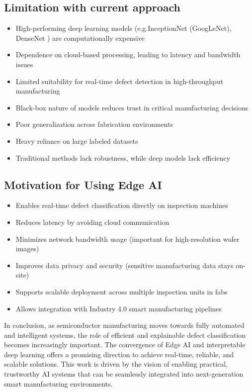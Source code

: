 \subsection {Limitation with current approach }
\begin{itemize}
\item High-performing deep learning models (e.g.InceptionNet (GoogLeNet), DenseNet ) are computationally expensive
\item Dependence on cloud-based processing, leading to latency and bandwidth issues
\item Limited suitability for real-time defect detection in high-throughput manufacturing
\item Black-box nature of models reduces trust in critical manufacturing decisions
\item Poor generalization across fabrication environments
\item Heavy reliance on large labeled datasets
\item Traditional methods lack robustness, while deep models lack efficiency
\end{itemize} 

\subsection {Motivation for Using Edge AI}
\begin{itemize}
\item Enables real-time defect classification directly on inspection machines
\item Reduces latency by avoiding cloud communication
\item Minimizes network bandwidth usage (important for high-resolution wafer images)
\item Improves data privacy and security (sensitive manufacturing data stays on-site)
\item Supports scalable deployment across multiple inspection units in fabs
\item Allows integration with Industry 4.0 smart manufacturing pipelines
\end{itemize}

In conclusion, as semiconductor manufacturing moves towards fully automated and intelligent systems, the role of efficient and explainable defect classification becomes increasingly important. The convergence of Edge AI and interpretable deep learning offers a promising direction to achieve real-time, reliable, and scalable solutions. This work is driven by the vision of enabling practical, trustworthy AI systems that can be seamlessly integrated into next-generation smart manufacturing environments.